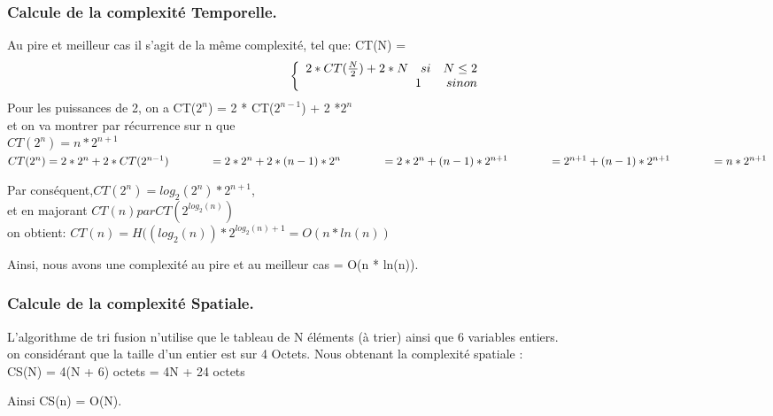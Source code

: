 \documentclass[12pt]{article}
\begin{document}
\subsubsection{Calcule de la complexité Temporelle. }
 Au pire et meilleur cas il s'agit de la même complexité, tel que:
 CT(N) =
 \color{blue}
  \[ 
\left\{
\begin{array}{r c l}
2*CT(\frac{N}{2}) + 2*N \quad si	\quad	N \le 2\\
\!  1 \qquad sinon
\end{array}
\right.
\]
\color{black}
Pour les puissances de 2, on a  CT($2^{n}$) = 2 * CT($2^{n-1}$) + 2 *$ 2^n $\\

et on va montrer par récurrence sur n que\\
\color{blue}
 $CT(2^n) = n*2^{n+1}$\\
 
$ CT(2^n) = 2 * 2^n + 2 * CT(2^{n-1})\\
\texttt{  } \texttt{  } \texttt{  }\qquad = 2 * 2^n + 2 * (n-1) * 2^n\\
\texttt{  } \texttt{  } \texttt{  } \qquad = 2 * 2^n + (n-1) * 2^{n+1}\\
\texttt{  } \texttt{  } \texttt{  } \qquad = 2^{n+1} + (n-1) * 2^{n+1}\\
\texttt{  } \texttt{  } \texttt{  } \qquad = n * 2^{n+1}\\
 $
 \color{black}
 
 Par conséquent,$ CT(2^n) = log_{2}(2^n)*2^{n+1}$,\\
  et en majorant $CT(n) par CT(2^{log_{2}(n)})$ \\
  on obtient: $CT(n) = H((log_{2}(n)) * 2^{log_{2}(n)+1} = O(n * ln(n))$ 

Ainsi, nous avons une complexité au pire et au meilleur cas = 
\color{blue}
O(n * ln(n)).
\color{black}

\subsubsection{Calcule de la complexité Spatiale.}
L'algorithme de tri fusion n'utilise que le tableau de N éléments (à trier) ainsi que 6 variables entiers.\\

on considérant que la taille d'un entier est sur 4 Octets.
Nous obtenant la complexité spatiale :\\
\color{blue}
CS(N) = 4(N + 6) octets = 4N + 24 octets
\color{black}

Ainsi \color{blue}
CS(n) = O(N).
\color{black}
\end{document}
